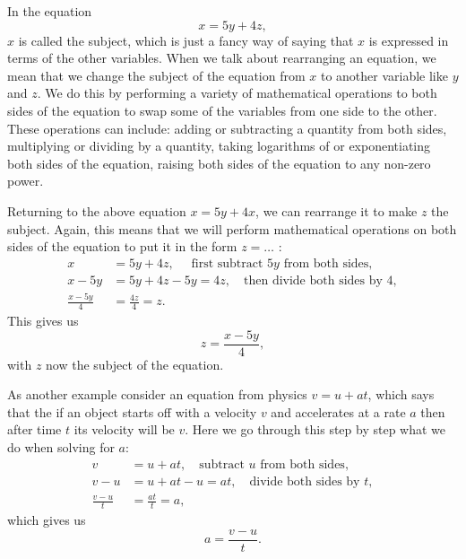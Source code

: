 In the equation
\begin{equation*}
x=5y+4z,
\end{equation*}
$x$ is called the subject, which is just a fancy way of saying that $x$ is expressed in terms of the other variables. When we talk about rearranging an equation, we mean that we change the subject of the equation from $x$ to another variable like $y$ and $z$. We do this by performing a variety of mathematical operations to both sides of the equation to swap some of the variables from one side to the other. \\

These operations can include: adding or subtracting a quantity from both sides, multiplying or dividing by a quantity, taking logarithms of or exponentiating both sides of the equation, raising both sides of the equation to any non-zero power.\\
\begin{ex}
Returning to the above equation $x=5y+4x$, we can rearrange it to make $z$ the subject. Again, this means that we will perform mathematical operations on both sides of the equation to put it in the form $z=\dots{}$ : 
\begin{align*}
x&=5y+4z, \quad \text{ first subtract $5y$ from both sides},\\
x-5y&=5y+4z-5y=4z, \quad \text{then divide both sides by 4},\\
\frac{x-5y}{4}&=\frac{4z}{4}=z.
\end{align*}
This gives us
\begin{equation*}
z=\frac{x-5y}{4},
\end{equation*}
with $z$ now the subject of the equation.
\end{ex}

\begin{ex}
As another example consider an equation from physics $v=u+at$, which says that the if an object starts off with a velocity $v$ and accelerates at a rate $a$ then after time $t$ its velocity will be $v$. Here we go through this step by step what we do when solving for $a$:
\begin{align*}
v&=u+at, \quad \text{subtract $u$ from both sides},\\
v-u&=u+at -u=at, \quad \text{divide both sides by $t$},\\
\frac{v-u}{t}&=\frac{at}{t}=a,
\end{align*}
which gives us
\begin{equation*}
a=\frac{v-u}{t}.
\end{equation*}
\end{ex}

